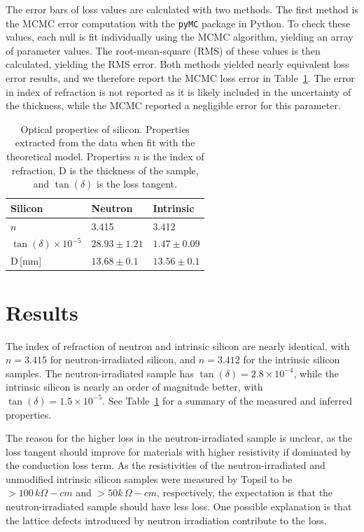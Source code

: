The error bars of loss values are calculated with two methods. The first method is the MCMC error computation with the \verb|pyMC| package in Python. To check these values, each null is fit individually using the MCMC algorithm, yielding an array of parameter values. The root-mean-square (RMS) of these values is then calculated, yielding the RMS error. Both methods yielded nearly equivalent loss error results, and we therefore report the MCMC loss error in Table~\ref{tab:silicon}. The error in index of refraction is not reported as it is likely included in the uncertainty of the thickness, while the MCMC reported a negligible error for this parameter.

\begin{table}
    \centering
\begin{tabular}{ |p{3cm}|p{3cm}|p{3cm}| }
 \hline
 Silicon & Neutron & Intrinsic\\
 \hline
  $n$ & 3.415 & 3.412 \\
 \hline
 $\tan(\delta)\times 10^{-5}$ & $28.93 \pm 1.21$ & $1.47 \pm 0.09$\\
 \hline
  D\,[mm] & $13.68 \pm 0.1 $ & $13.56 \pm 0.1$\\
 \hline
\end{tabular}
    \caption{Optical properties of silicon. Properties extracted from the data when fit with the theoretical model. Properties $n$ is the index of refraction, D is the thickness of the sample, and $\tan(\delta)$ is the loss tangent.}
    \label{tab:silicon}
\end{table}

\section{Results}

The index of refraction of neutron and intrinsic silicon are nearly identical, with $n =3.415$ for neutron-irradiated silicon, and $n =3.412$ for the intrinsic silicon samples. The neutron-irradiated sample has $\tan(\delta) = 2.8\times10^{-4}$, while the intrinsic silicon is nearly an order of magnitude better, with $\tan(\delta)= 1.5 \times 10^{-5}$. See Table~\ref{tab:silicon} for a summary of the measured and inferred properties.

The reason for the higher loss in the neutron-irradiated sample is unclear, as the loss tangent should improve for materials with higher resistivity if dominated by the conduction loss term. As the resistivities of the neutron-irradiated and unmodified intrinsic silicon samples were measured by Topsil to be $>100\,k\Omega-cm$ and $>50k\,\Omega-cm$, respectively, the expectation is that the neutron-irradiated sample should have less loss. One possible explanation is that the lattice defects introduced by neutron irradiation contribute to the loss.

